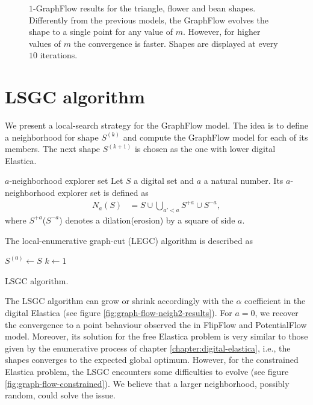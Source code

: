 \begin{figure}
\begin{tabular}{cccc}
\end{tabular}
\caption{$1$-GraphFlow results for the triangle, flower and bean shapes. Differently from the previous models, the GraphFlow evolves the shape to a single point for any value of $m$. However, for higher values of $m$ the convergence is faster. Shapes are displayed at every $10$ iterations.}
\label{fig:graph-flow-neigh0-results}
\end{figure}

\section{LSGC algorithm}
	We present a local-search strategy for the GraphFlow model. The idea is to define a neighborhood for shape $S^{(k)}$ and compute the GraphFlow model for each of its members. The next shape $S^{(k+1)}$ is chosen as the one with lower digital Elastica.

\begin{definition}{$a$-neighborhood explorer set}
	Let $S$ a digital set and $a$ a natural number. Its $a$-neighborhood explorer set is defined as
	\begin{align*}
		N_a(S) &= S \cup \bigcup_{a' < a}{S^{+a} \cup S^{-a}},
	\end{align*}
	where $S^{+a}$($S^{-a}$) denotes a dilation(erosion) by a square of side $a$.
\end{definition}

The local-enumerative graph-cut (LEGC) algorithm is described as


\begin{algorithm}
 
 \BlankLine
 $S^{(0)} \longleftarrow S$\;
 $k \longleftarrow 1$\;
 \caption{LSGC algorithm.}
 \label{alg:legc-algorithm}  
\end{algorithm}

The LSGC algorithm can grow or shrink accordingly with the $\alpha$ coefficient in the digital Elastica (see figure \ref{fig:graph-flow-neigh2-results}). For $a=0$, we recover the convergence to a point behaviour observed the in FlipFlow and PotentialFlow model. Moreover, its solution for the free Elastica problem is very similar to those given by the enumerative process of chapter \ref{chapter:digital-elastica}, i.e., the shapes converges to the expected global optimum. However, for the constrained Elastica problem, the LSGC encounters some difficulties to evolve (see figure \ref{fig:graph-flow-constrained}). We believe that a larger neighborhood, possibly random, could solve the issue.

